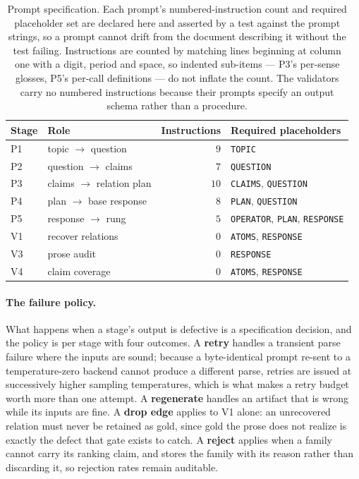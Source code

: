 \begin{table}[tbp]
\centering\small
\caption{Prompt specification. Each prompt's numbered-instruction count and required placeholder set are
  declared here and asserted by a test against the prompt strings, so a prompt cannot drift from the
  document describing it without the test failing. Instructions are counted by matching lines beginning
  at column one with a digit, period and space, so indented sub-items --- P3's per-sense glosses, P5's
  per-call definitions --- do not inflate the count. The validators carry no numbered instructions
  because their prompts specify an output schema rather than a procedure.}
\label{tab:promptspec}
\begin{tabular}{@{}llrl@{}}
\toprule
Stage & Role & Instructions & Required placeholders \\
\midrule
P1 & topic $\to$ question        & $9$  & \texttt{TOPIC} \\
P2 & question $\to$ claims       & $7$  & \texttt{QUESTION} \\
P3 & claims $\to$ relation plan  & $10$ & \texttt{CLAIMS}, \texttt{QUESTION} \\
P4 & plan $\to$ base response    & $8$  & \texttt{PLAN}, \texttt{QUESTION} \\
P5 & response $\to$ rung         & $5$  & \texttt{OPERATOR}, \texttt{PLAN}, \texttt{RESPONSE} \\
\midrule
V1 & recover relations           & $0$  & \texttt{ATOMS}, \texttt{RESPONSE} \\
V3 & prose audit                 & $0$  & \texttt{RESPONSE} \\
V4 & claim coverage              & $0$  & \texttt{ATOMS}, \texttt{RESPONSE} \\
\bottomrule
\end{tabular}
\end{table}

\paragraph{The failure policy.} What happens when a stage's output is defective is a specification
decision, and the policy is per stage with four outcomes. A \textbf{retry} handles a transient parse
failure where the inputs are sound; because a byte-identical prompt re-sent to a temperature-zero backend
cannot produce a different parse, retries are issued at successively higher sampling temperatures, which
is what makes a retry budget worth more than one attempt. A \textbf{regenerate} handles an artifact that
is wrong while its inputs are fine. A \textbf{drop edge} applies to V1 alone: an unrecovered relation
must never be retained as gold, since gold the prose does not realize is exactly the defect that gate
exists to catch. A \textbf{reject} applies when a family cannot carry its ranking claim, and stores the
family with its reason rather than discarding it, so rejection rates remain auditable.

